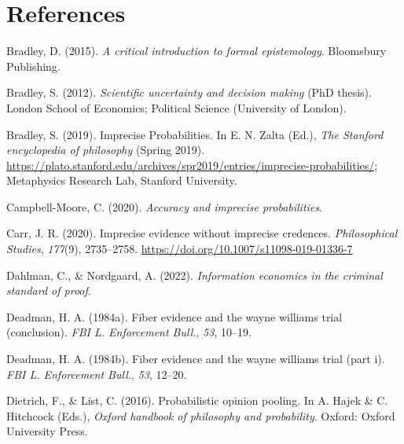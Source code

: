 \documentclass[
  10pt,
  dvipsnames,enabledeprecatedfontcommands]{scrartcl}
\newlength{\cslhangindent}
\newlength{\cslentryspacingunit} %
\newenvironment{CSLReferences}[2] %
 {%
  \setlength{\parindent}{0pt}
  \ifodd #1
  \let\oldpar\par
  \def\par{\hangindent=\cslhangindent\oldpar}
  \fi
  \setlength{\parskip}{#2\cslentryspacingunit}
 }%
 {}
\begin{document}
\hypertarget{references}{%
\section*{References}\label{references}}

\hypertarget{refs}{}
\begin{CSLReferences}{1}{0}
\leavevmode{}%
Bradley, D. (2015). \emph{A critical introduction to formal
epistemology}. Bloomsbury Publishing.

\leavevmode{}%
Bradley, S. (2012). \emph{Scientific uncertainty and decision making}
(PhD thesis). London School of Economics; Political Science (University
of London).

\leavevmode{}%
Bradley, S. (2019). {Imprecise Probabilities}. In E. N. Zalta (Ed.),
\emph{The {Stanford} encyclopedia of philosophy} ({S}pring 2019).
\url{https://plato.stanford.edu/archives/spr2019/entries/imprecise-probabilities/};
Metaphysics Research Lab, Stanford University.

\leavevmode{}%
Campbell-Moore, C. (2020). \emph{Accuracy and imprecise probabilities}.

\leavevmode{}%
Carr, J. R. (2020). Imprecise evidence without imprecise credences.
\emph{Philosophical Studies}, \emph{177}(9), 2735--2758.
\url{https://doi.org/10.1007/s11098-019-01336-7}

\leavevmode{}%
Dahlman, C., \& Nordgaard, A. (2022). \emph{Information economics in the
criminal standard of proof}.

\leavevmode{}%
Deadman, H. A. (1984a). Fiber evidence and the wayne williams trial
(conclusion). \emph{FBI L. Enforcement Bull.}, \emph{53}, 10--19.

\leavevmode{}%
Deadman, H. A. (1984b). Fiber evidence and the wayne williams trial
(part i). \emph{FBI L. Enforcement Bull.}, \emph{53}, 12--20.

\leavevmode{}%
Dietrich, F., \& List, C. (2016). Probabilistic opinion pooling. In A.
Hajek \& C. Hitchcock (Eds.), \emph{Oxford handbook of philosophy and
probability}. Oxford: Oxford University Press.


\end{CSLReferences}
\end{document}
